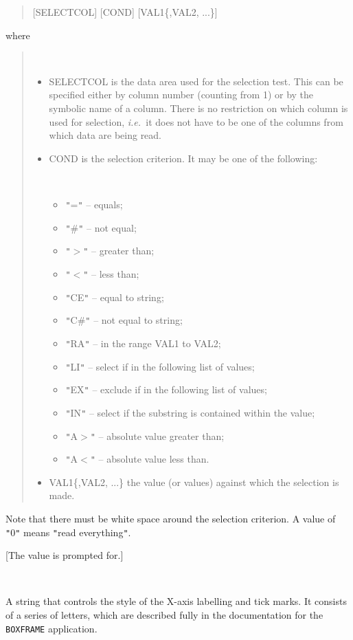 \documentclass[twoside,11pt]{article}
\newcommand{\htmlref}[2]{#1}
\renewcommand{\_}{\texttt{\symbol{95}}}
\newcommand{\ie}{{\em i.e.\ }}
\newcommand{\cnam}[1]{{\tt #1}}
\newcommand{\iref} [1]{\htmlref{#1}{#1}}
\newcommand{\sstsubsection}[1]{ \item[{#1}] \mbox{} \\}
\newcommand{\sstitemlist}[1]{
  \mbox{} \\
  \vspace{-3.5ex}
  \begin{itemize}
     #1
  \end{itemize}
}
\newcommand{\sstitem}{\item}
\newcommand{\sstsubsection}[1]{\item[{#1}]}
\newcommand{\sstitemlist}[1]{
      \begin{itemize}
         #1
      \end{itemize}
      \\
   }
\newcommand{\sstitem}{\item}
\begin{document}
{{{         \begin{quote}
            [SELECT\_COL] [COND] [VAL1\{,VAL2, ...\}]
         \end{quote}

         where

         \begin{quote}
         \sstitemlist{

            \sstitem
               SELECT\_COL is the data area used for the selection
               test. This can be specified either by column number
               (counting from 1) or by the symbolic name of a column.
               There is no restriction on which column is used for
               selection, \ie it does not have to be one of the columns
               from which data are being read.

            \sstitem
               COND is the selection criterion. It may be one of the
               following:

            \sstitemlist{

               \sstitem {\tt "}={\tt "} -- equals;
               \sstitem {\tt "}\#{\tt "} -- not equal;
               \sstitem {\tt "}$>${\tt "} -- greater than;
               \sstitem {\tt "}$<${\tt "} -- less than;
               \sstitem {\tt "}CE{\tt "} -- equal to string;
               \sstitem {\tt "}C\#{\tt "} -- not equal to string;
               \sstitem {\tt "}RA{\tt "} -- in the range VAL1 to VAL2;
               \sstitem {\tt "}LI{\tt "} -- select if in the following list of values;
               \sstitem {\tt "}EX{\tt "} -- exclude if in the following list of values;
               \sstitem {\tt "}IN{\tt "} -- select if the substring is contained within the
               value;
               \sstitem {\tt "}A$>${\tt "} -- absolute value greater than;
               \sstitem {\tt "}A$<${\tt "} -- absolute value less than.
            }

            \sstitem
               VAL1\{,VAL2, ...\} the value (or values) against which the
               selection is made.

         }
         \end{quote}

         Note that there must be white space around the selection
         criterion. A value of {\tt "}0{\tt "} means {\tt "}read everything{\tt "}.

         [The value is prompted for.]
      }
      \sstsubsection{
         XOPT = \_CHAR (Read and Write)
      }{
         A string that controls the style of the X-axis labelling and
         tick marks. It consists of a series of letters, which are
         described fully in the documentation for the \cnam{\iref{BOXFRAME}}
         application.

}}}
\end{document}
